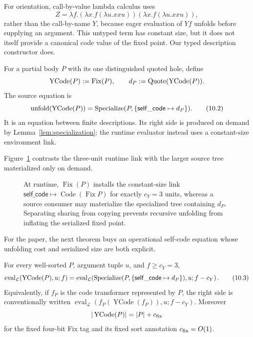 For orientation, call-by-value lambda calculus uses
\[
 Z=\lambda f.(\lambda x.f(\lambda u.xx u))
                 (\lambda x.f(\lambda u.xx u)),
\]
rather than the call-by-name \(Y\), because eager evaluation of \(Yf\) unfolds
before supplying an argument.  This untyped term has constant size, but it
does not itself provide a canonical code value of the fixed point.  Our typed
description constructor does.

For a partial body \(P\) with its one distinguished quoted hole, define
\[
 \operatorname{YCode}(P):=\operatorname{Fix}(P),\qquad
 d_P:=\operatorname{Quote}(\operatorname{YCode}(P)).
\]
The source equation is
\[
 \operatorname{unfold}(\operatorname{YCode}(P))
 =\operatorname{Specialize}(P,\{\mathsf{self\_code}\mapsto d_P\}).
\tag{10.2}\label{eq:ycode-source}
\]
It is an equation between finite descriptions.  Its right side is produced on
demand by Lemma~\ref{lem:specialization}; the runtime evaluator instead uses a
constant-size environment link.

Figure~\ref{fig:ycode-link} contrasts the three-unit runtime link with the
larger source tree materialized only on demand.
\begin{figure}[t]
\centering

\caption{At runtime, \(\operatorname{Fix}(P)\) installs the constant-size link \(\mathsf{self\_code}\mapsto\operatorname{Code}(\operatorname{Fix}P)\) for exactly \(c_Y=3\) units, whereas a source consumer may materialize the specialized tree containing \(d_P\).  Separating sharing from copying prevents recursive unfolding from inflating the serialized fixed point.}
\label{fig:ycode-link}
\end{figure}

For the paper, the next theorem buys an operational self-code equation whose
unfolding cost and serialized size are both explicit.
\begin{theorem}
\label{thm:ycode}\enspace%
For every well-sorted \(P\), argument tuple \(u\), and \(f\geq c_Y=3\),
\[
 \operatorname{eval}_{\mathcal L}(\operatorname{YCode}(P),u;f)
 =\operatorname{eval}_{\mathcal L}\!\left(
   \operatorname{Specialize}(P,\{\mathsf{self\_code}\mapsto d_P\}),u;f-c_Y\right).
\tag{10.3}\label{eq:ycode-eval}
\]
Equivalently, if \(f_P\) is the code transformer represented by \(P\), the
right side is conventionally written
\(\operatorname{eval}_{\mathcal L}(f_P(\operatorname{YCode}(f_P)),u;
f-c_Y)\).  Moreover
\[
 |\operatorname{YCode}(P)|=|P|+c_{\rm fix}
\]
for the fixed four-bit Fix tag and its fixed sort annotation
\(c_{\rm fix}=O(1)\).
\end{theorem}


